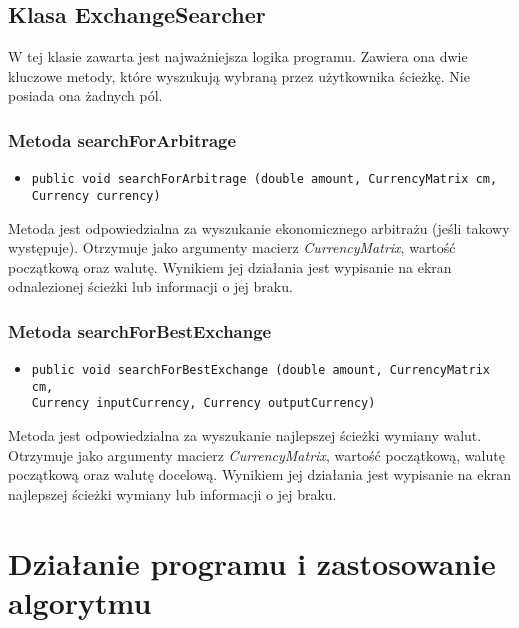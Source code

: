 \documentclass[a4paper,11pt]{article}
\newcommand\tab[1][0.6cm]{\hspace*{#1}}
\begin{document}
\subsection{Klasa ExchangeSearcher}

\tab W tej klasie zawarta jest najważniejsza logika programu. Zawiera ona dwie kluczowe metody, które wyszukują wybraną przez użytkownika ścieżkę. Nie posiada ona żadnych pól.

\subsubsection{Metoda searchForArbitrage}

\tab 
\begin{itemize}
\item \begin{lstlisting}
public void searchForArbitrage (double amount, CurrencyMatrix cm,
Currency currency)
\end{lstlisting}
\end{itemize}

\tab Metoda jest odpowiedzialna za wyszukanie ekonomicznego arbitrażu (jeśli takowy występuje). Otrzymuje jako argumenty macierz \textit{CurrencyMatrix}, wartość początkową oraz walutę. Wynikiem jej działania jest wypisanie na ekran odnalezionej ścieżki lub informacji o jej braku. 

\subsubsection{Metoda searchForBestExchange}

\tab 
\begin{itemize}
\item \begin{lstlisting}
public void searchForBestExchange (double amount, CurrencyMatrix cm,
Currency inputCurrency, Currency outputCurrency)
\end{lstlisting}
\end{itemize}

\tab Metoda jest odpowiedzialna za wyszukanie najlepszej ścieżki wymiany walut. Otrzymuje jako argumenty macierz \textit{CurrencyMatrix}, wartość początkową, walutę początkową oraz walutę docelową. Wynikiem jej działania jest wypisanie na ekran najlepszej ścieżki wymiany lub informacji o jej braku.

\section{Działanie programu i zastosowanie algorytmu}
\end{document}

